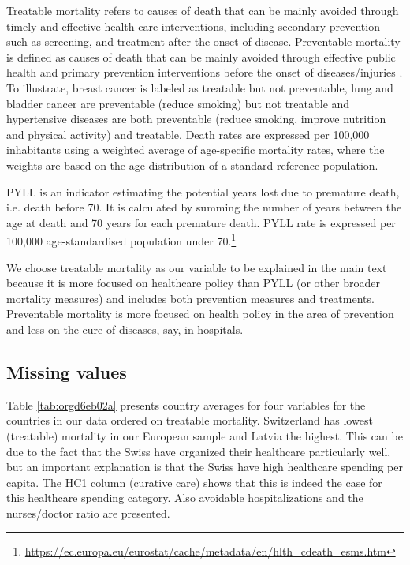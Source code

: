 \documentclass{article}
\begin{document}
Treatable mortality refers to causes of death that can be mainly avoided through timely and effective health care interventions, including secondary prevention such as screening, and treatment after the onset of disease. Preventable mortality is defined as causes of death that can be mainly avoided through effective public health and primary prevention interventions before the onset of diseases/injuries \citep{countryprofileUK}. To illustrate, breast cancer is labeled as treatable but not preventable, lung and bladder cancer are preventable (reduce smoking) but not treatable and hypertensive diseases are both preventable (reduce smoking, improve nutrition and physical activity) and treatable. Death rates are expressed per 100,000 inhabitants using a weighted average of age-specific mortality rates, where the weights are based on the age distribution of a standard reference population.

PYLL is an indicator estimating the potential years lost due to premature death, i.e. death before 70. It is calculated by summing the number of years between the age at death and 70 years for each premature death. PYLL rate is expressed per 100,000 age-standardised population under 70.\footnote{\url{https://ec.europa.eu/eurostat/cache/metadata/en/hlth\_cdeath\_esms.htm}}

We choose treatable mortality as our variable to be explained in the main text because it is more focused on healthcare policy than PYLL (or other broader mortality measures) and includes both prevention measures and treatments. Preventable mortality is more focused on health policy in the area of prevention and less on the cure of diseases, say, in hospitals.


\subsection{Missing values}
\label{sec:orgac0c417}

Table \ref{tab:orgd6eb02a} presents country averages for four variables for the countries in our data ordered on treatable mortality. Switzerland has lowest (treatable) mortality in our European sample and Latvia the highest. This can be due to the fact that the Swiss have organized their healthcare particularly well, but an important explanation is that the Swiss have high healthcare spending per capita. The HC1 column (curative care) shows that this is indeed the case for this healthcare spending category. Also  avoidable hospitalizations and the nurses/doctor ratio are presented.
\end{document}
